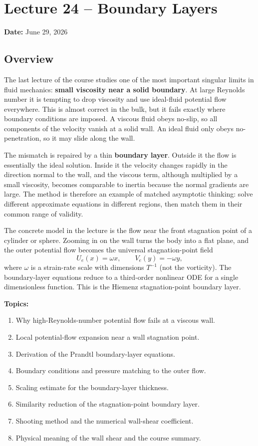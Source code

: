 \documentclass[../main.tex]{subfiles}
\begin{document}
\section{Lecture 24 -- Boundary Layers}\label{sec:lec24}
\begin{center}
  \textbf{Date:} June 29, 2026
\end{center}

\subsection*{Overview}
The last lecture of the course studies one of the most important singular
limits in fluid mechanics: \textbf{small viscosity near a solid boundary}.  At
large Reynolds number it is tempting to drop viscosity and use ideal-fluid
potential flow everywhere.  This is almost correct in the bulk, but it fails
exactly where boundary conditions are imposed.  A viscous fluid obeys no-slip,
so all components of the velocity vanish at a solid wall.  An ideal fluid only
obeys no-penetration, so it may slide along the wall.

The mismatch is repaired by a thin \textbf{boundary layer}.  Outside it the
flow is essentially the ideal solution.  Inside it the velocity changes rapidly
in the direction normal to the wall, and the viscous term, although multiplied
by a small viscosity, becomes comparable to inertia because the normal
gradients are large.  The method is therefore an example of matched asymptotic
thinking: solve different approximate equations in different regions, then
match them in their common range of validity.

The concrete model in the lecture is the flow near the front stagnation point
of a cylinder or sphere.  Zooming in on the wall turns the body into a flat
plane, and the outer potential flow becomes the universal stagnation-point
field
\[
  U_e(x)=\omega x,\qquad V_e(y)=-\omega y,
\]
where $\omega$ is a strain-rate scale with dimensions $T^{-1}$ (not the
vorticity).  The boundary-layer equations reduce to a third-order nonlinear ODE
for a single dimensionless function.  This is the Hiemenz stagnation-point
boundary layer.

\medskip\noindent\textbf{Topics:}
\begin{enumerate}
  \item Why high-Reynolds-number potential flow fails at a viscous wall.
  \item Local potential-flow expansion near a wall stagnation point.
  \item Derivation of the Prandtl boundary-layer equations.
  \item Boundary conditions and pressure matching to the outer flow.
  \item Scaling estimate for the boundary-layer thickness.
  \item Similarity reduction of the stagnation-point boundary layer.
  \item Shooting method and the numerical wall-shear coefficient.
  \item Physical meaning of the wall shear and the course summary.
\end{enumerate}
\end{document}
